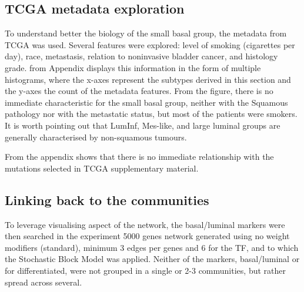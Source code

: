 \newpage

\subsection{TCGA metadata exploration} \label{s:N_I:sel_tfs_metadata}

To understand better the biology of the small basal group, the metadata from TCGA \citep{Cancer_Genome_Atlas_Research_Network2014-xp} was used. Several features were explored: level of smoking (cigarettes per day), race, metastasis, relation to noninvasive bladder cancer, and histology grade.  from Appendix displays this information in the form of multiple histograms, where the x-axes represent the subtypes derived in this section and the y-axes the count of the metadata features. From the figure, there is no immediate characteristic for the small basal group, neither with the Squamous pathology nor with the metastatic status, but most of the patients were smokers. It is worth pointing out that LumInf, Mes-like, and large luminal groups are generally characterised by non-squamous tumours. 

From the appendix  shows that there is no immediate relationship with the mutations selected in TCGA supplementary material.


\subsection{Linking back to the communities} \label{s:N_I:sel_tfs_net}

To leverage visualising aspect of the network, the basal/luminal markers were then searched in the experiment 5000 genes network generated using no weight modifiers (standard), minimum 3 edges per genes and 6 for the TF, and to which the Stochastic Block Model was applied. Neither of the markers, basal/luminal or for differentiated, were not grouped in a single or 2-3 communities, but rather spread across several.


